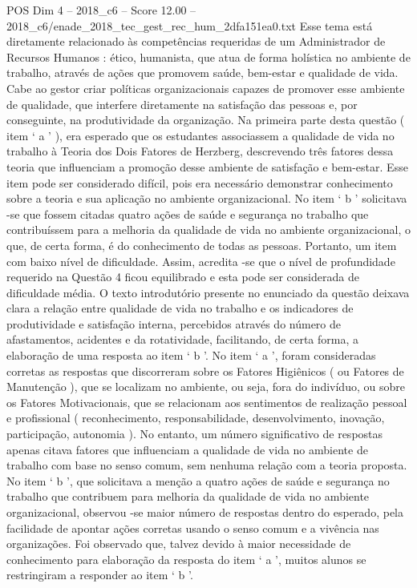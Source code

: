 \begin{textsample}{POS Dim 4 – 2018\_c6 – Score 12.00 – 2018\_c6/enade\_2018\_tec\_gest\_rec\_hum\_2dfa151ea0.txt}
Esse tema está diretamente relacionado às competências requeridas de um Administrador de Recursos Humanos : ético, humanista, que atua de forma holística no ambiente de trabalho, através de ações que promovem saúde, bem-estar e qualidade de vida.
Cabe ao gestor criar políticas organizacionais capazes de promover esse ambiente de qualidade, que interfere diretamente na satisfação das pessoas e, por conseguinte, na produtividade da organização.
Na primeira parte desta questão ( item ‘ a ’ ), era esperado que os estudantes associassem a qualidade de vida no trabalho à Teoria dos Dois Fatores de Herzberg, descrevendo três fatores dessa teoria que influenciam a promoção desse ambiente de satisfação e bem-estar.
Esse item pode ser considerado difícil, pois era necessário demonstrar conhecimento sobre a teoria e sua aplicação no ambiente organizacional.
No item ‘ b ’ solicitava -se que fossem citadas quatro ações de saúde e segurança no trabalho que contribuíssem para a melhoria da qualidade de vida no ambiente organizacional, o que, de certa forma, é do conhecimento de todas as pessoas.
Portanto, um item com baixo nível de dificuldade.
Assim, acredita -se que o nível de profundidade requerido na Questão 4 ficou equilibrado e esta pode ser considerada de dificuldade média.
O texto introdutório presente no enunciado da questão deixava clara a relação entre qualidade de vida no trabalho e os indicadores de produtividade e satisfação interna, percebidos através do número de afastamentos, acidentes e da rotatividade, facilitando, de certa forma, a elaboração de uma resposta ao item ‘ b ’.
No item ‘ a ’, foram consideradas corretas as respostas que discorreram sobre os Fatores Higiênicos ( ou Fatores de Manutenção ), que se localizam no ambiente, ou seja, fora do indivíduo, ou sobre os Fatores Motivacionais, que se relacionam aos sentimentos de realização pessoal e profissional ( reconhecimento, responsabilidade, desenvolvimento, inovação, participação, autonomia ).
No entanto, um número significativo de respostas apenas citava fatores que influenciam a qualidade de vida no ambiente de trabalho com base no senso comum, sem nenhuma relação com a teoria proposta.
No item ‘ b ’, que solicitava a menção a quatro ações de saúde e segurança no trabalho que contribuem para melhoria da qualidade de vida no ambiente organizacional, observou -se maior número de respostas dentro do esperado, pela facilidade de apontar ações corretas usando o senso comum e a vivência nas organizações.
Foi observado que, talvez devido à maior necessidade de conhecimento para elaboração da resposta do item ‘ a ’, muitos alunos se restringiram a responder ao item ‘ b ’.

\end{textsample}
